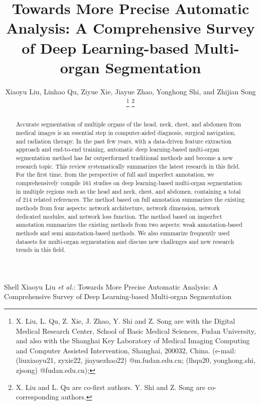 \documentclass[lettersize,journal]{IEEEtran}
\begin{document}
\title{Towards More Precise Automatic Analysis: A Comprehensive Survey of Deep Learning-based Multi-organ Segmentation}

\author{Xiaoyu Liu, Linhao Qu, Ziyue Xie, Jiayue Zhao, Yonghong Shi, and Zhijian Song
\thanks{X. Liu, L. Qu, Z. Xie, J. Zhao, Y. Shi and Z. Song are with the Digital Medical Research Center, School of Basic Medical Sciences, Fudan University, and also with the Shanghai Key Laboratory of Medical Imaging Computing and Computer Assisted Intervention, Shanghai, 200032, China. (e-mail: (liuxiaoyu21, zyxie22, jiayuezhao22) @m.fudan.edu.cn; (lhqu20, yonghong.shi, zjsong) @fudan.edu.cn);}
\thanks{X. Liu and L. Qu are co-first authors. Y. Shi and Z. Song are co-corresponding authors.}}


%
{Shell Xiaoyu Liu {\textit{et al.}}: Towards More Precise Automatic Analysis: A Comprehensive Survey of Deep Learning-based Multi-organ Segmentation}


\maketitle

\begin{abstract}
Accurate segmentation of multiple organs of the head, neck, chest, and abdomen from medical images is an essential step in computer-aided diagnosis, surgical navigation, and radiation therapy. In the past few years, with a data-driven feature extraction approach and end-to-end training, automatic deep learning-based multi-organ segmentation method has far outperformed traditional methods and become a new research topic. This review systematically summarizes the latest research in this field. For the first time, from the perspective of full and imperfect annotation, we comprehensively compile 161 studies on deep learning-based multi-organ segmentation in multiple regions such as the head and neck, chest, and abdomen, containing a total of 214 related references. The method based on  full annotation summarizes the existing methods from four aspects: network architecture, network dimension, network dedicated modules, and network loss function. The method based on imperfect annotation summarizes the existing methods from two aspects: weak annotation-based methods and semi annotation-based methods. We also summarize frequently used datasets for multi-organ segmentation and discuss new challenges and new research trends in this field.
\end{abstract}
\end{document}

